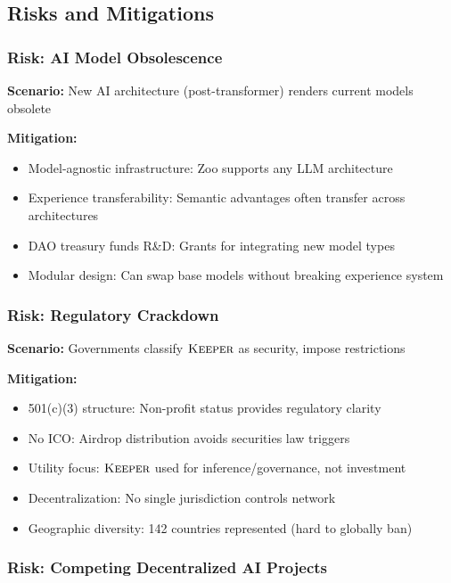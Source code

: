 \documentclass[11pt,letterpaper]{article}
\theoremstyle{definition}
\theoremstyle{remark}
\newcommand{\KEEPER}{\textsc{Keeper}}
\begin{document}
\subsection{Risks and Mitigations}

\subsubsection{Risk: AI Model Obsolescence}

\textbf{Scenario:} New AI architecture (post-transformer) renders current models obsolete

\textbf{Mitigation:}
\begin{itemize}
\item Model-agnostic infrastructure: Zoo supports any LLM architecture
\item Experience transferability: Semantic advantages often transfer across architectures
\item DAO treasury funds R\&D: Grants for integrating new model types
\item Modular design: Can swap base models without breaking experience system
\end{itemize}

\subsubsection{Risk: Regulatory Crackdown}

\textbf{Scenario:} Governments classify $\KEEPER$ as security, impose restrictions

\textbf{Mitigation:}
\begin{itemize}
\item 501(c)(3) structure: Non-profit status provides regulatory clarity
\item No ICO: Airdrop distribution avoids securities law triggers
\item Utility focus: $\KEEPER$ used for inference/governance, not investment
\item Decentralization: No single jurisdiction controls network
\item Geographic diversity: 142 countries represented (hard to globally ban)
\end{itemize}

\subsubsection{Risk: Competing Decentralized AI Projects}
\end{document}
